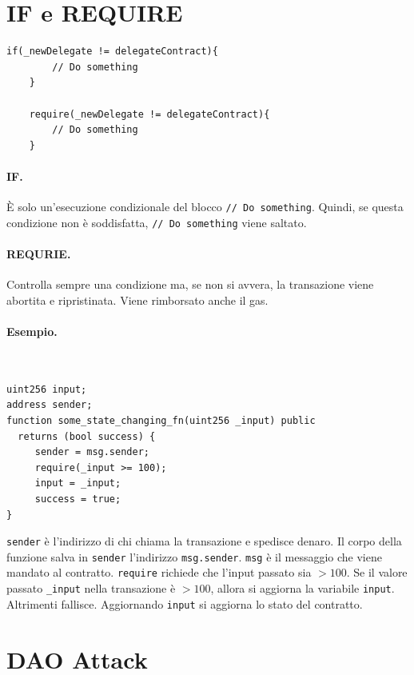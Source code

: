 \section{IF e REQUIRE}

\begin{lstlisting}[language=Solidity]
    if(_newDelegate != delegateContract){
        // Do something
    }

    require(_newDelegate != delegateContract){
        // Do something
    }
\end{lstlisting}

\paragraph{IF.}
È solo un'esecuzione condizionale del blocco \verb|// Do something|.
Quindi, se questa condizione non
è soddisfatta, \verb|// Do something| viene saltato.

\paragraph{REQURIE.}
Controlla sempre una condizione ma,
se non si avvera, la transazione viene abortita e
ripristinata. Viene rimborsato anche il gas.
\ \\
\paragraph{Esempio.}\

\begin{lstlisting}[language=Solidity]
uint256 input;
address sender;
function some_state_changing_fn(uint256 _input) public 
  returns (bool success) {
     sender = msg.sender;
     require(_input >= 100);
     input = _input;
     success = true;
}
\end{lstlisting}

\verb|sender| è l'indirizzo di chi chiama la transazione e spedisce denaro.
Il corpo della funzione salva in \verb|sender| l'indirizzo \verb|msg.sender|.
\verb|msg| è il messaggio che viene
mandato al contratto. \verb|require| richiede che l'input passato sia $ > 100$.
Se il valore passato \verb|_input| nella transazione è $ > 100$,
allora si aggiorna la variabile \verb|input|.
Altrimenti fallisce. Aggiornando \verb|input| si aggiorna lo stato del contratto.

\section{DAO Attack}

